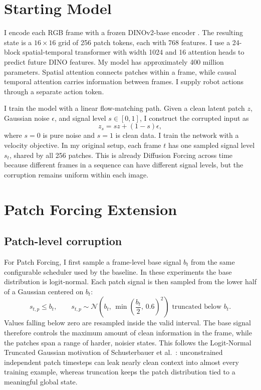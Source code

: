 \documentclass[10pt,a4paper]{article}
\begin{document}
\section{Starting Model}

I encode each RGB frame with a frozen DINOv2-base encoder \cite{oquab2023dinov2}. The resulting state is a $16\times16$ grid of 256 patch tokens, each with 768 features. I use a 24-block spatial-temporal transformer with width 1024 and 16 attention heads to predict future DINO features. My model has approximately 400 million parameters. Spatial attention connects patches within a frame, while causal temporal attention carries information between frames. I supply robot actions through a separate action token.

I train the model with a linear flow-matching path. Given a clean latent patch $z$, Gaussian noise $\epsilon$, and signal level $s\in[0,1]$, I construct the corrupted input as
\begin{equation}
    z_s = s z + (1-s)\epsilon ,
\end{equation}
where $s=0$ is pure noise and $s=1$ is clean data. I train the network with a velocity objective. In my original setup, each frame $t$ has one sampled signal level $s_t$, shared by all 256 patches. This is already Diffusion Forcing across time because different frames in a sequence can have different signal levels, but the corruption remains uniform within each image.

\section{Patch Forcing Extension}

\subsection{Patch-level corruption}

For Patch Forcing, I first sample a frame-level base signal $b_t$ from the same configurable scheduler used by the baseline. In these experiments the base distribution is logit-normal. Each patch signal is then sampled from the lower half of a Gaussian centered on $b_t$:
\begin{equation}
    s_{t,p} \leq b_t, \qquad
    s_{t,p} \sim \mathcal{N}\!\left(b_t,\,
    \min\left(\frac{b_t}{2},\,0.6\right)^2\right)
    \text{ truncated below } b_t .
\end{equation}
Values falling below zero are resampled inside the valid interval. The base signal therefore controls the maximum amount of clean information in the frame, while the patches span a range of harder, noisier states. This follows the Logit-Normal Truncated Gaussian motivation of Schusterbauer et al.\ \cite{schusterbauer2026patch}: unconstrained independent patch timesteps can leak nearly clean context into almost every training example, whereas truncation keeps the patch distribution tied to a meaningful global state.
\end{document}
